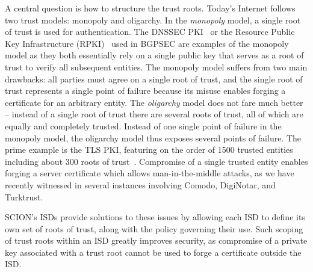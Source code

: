 \documentclass[a4paper]{llncs}
\newcommand\SCION{{\small\textsf{SCION}}\xspace}
\begin{document}
A central question is how to structure the trust roots. Today's Internet follows
two trust models: monopoly and oligarchy. In the \emph{monopoly} model, a single
root of trust is used for authentication. The DNSSEC PKI~\cite{rfc4033} or the
Resource Public Key Infrastructure (RPKI)~\cite{rpki-url} used in BGPSEC are
examples of the monopoly model as they both essentially rely on a single public
key that serves as a root of trust to verify all subsequent entities. The
monopoly model suffers from two main drawbacks: all parties must agree on a
single root of trust, and the single root of trust represents a single point of
failure because its misuse enables forging a certificate for an
arbitrary entity. The \emph{oligarchy}
model does not fare much better -- instead of a single root of trust there are
several roots of trust, all of which are equally and completely trusted.
Instead of one single point of failure in the monopoly model, the oligarchy
model thus exposes several points of failure.
The prime example is the TLS PKI, featuring on the order of 1500
trusted entities including about 300 roots of
trust~\cite{SSL-observatory,AbBiMiWoXi2013}. 
Compromise of a single trusted entity enables forging a server certificate which
allows man-in-the-middle attacks, as we have recently witnessed in several
instances involving Comodo, DigiNotar, and Turktrust.

\SCION's ISDs provide solutions to these issues by allowing each ISD to define its own set of
roots of trust, along with the policy governing their use. Such scoping of trust
roots within an ISD greatly improves security, as compromise of a private key
associated with a trust root cannot be used to forge a certificate outside the
ISD. 
\end{document}
